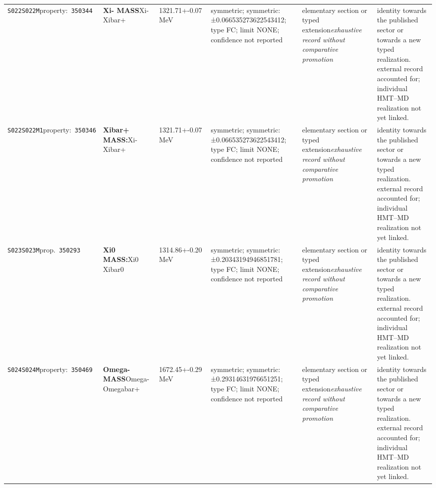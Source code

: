 \begin{landscape}
\begin{longtable}{L{1.85cm}L{4.45cm}L{2.35cm}L{4.05cm}L{3.35cm}L{7.15cm}}
\texttt{S022}\newline \texttt{S022M}\newline property:\ \texttt{350344} & \textbf{Xi- MASS}\newline Xi- \textbar{}\allowbreak{} Xibar+ & 1321.71+-0.07\,MeV & symmetric; symmetric: ±0.066535273622543412; type FC; limit NONE; confidence not reported & elementary section or typed extension\newline \emph{exhaustive record without comparative promotion} & identity towards the published sector or towards a new typed realization. external record accounted for; individual HMT--MD realization not yet linked. \\
\texttt{S022}\newline \texttt{S022M1}\newline property:\ \texttt{350346} & \textbf{Xibar+ MASS:}\newline Xi- \textbar{}\allowbreak{} Xibar+ & 1321.71+-0.07\,MeV & symmetric; symmetric: ±0.066535273622543412; type FC; limit NONE; confidence not reported & elementary section or typed extension\newline \emph{exhaustive record without comparative promotion} & identity towards the published sector or towards a new typed realization. external record accounted for; individual HMT--MD realization not yet linked. \\
\texttt{S023}\newline \texttt{S023M}\newline prop.\ \texttt{350293} & \textbf{Xi0 MASS:}\newline Xi0 \textbar{}\allowbreak{} Xibar0 & 1314.86+-0.20\,MeV & symmetric; symmetric: ±0.20343194946851781; type FC; limit NONE; confidence not reported & elementary section or typed extension\newline \emph{exhaustive record without comparative promotion} & identity towards the published sector or towards a new typed realization. external record accounted for; individual HMT--MD realization not yet linked. \\
\texttt{S024}\newline \texttt{S024M}\newline property:\ \texttt{350469} & \textbf{Omega- MASS}\newline Omega- \textbar{}\allowbreak{} Omegabar+ & 1672.45+-0.29\,MeV & symmetric; symmetric: ±0.29314631976651251; type FC; limit NONE; confidence not reported & elementary section or typed extension\newline \emph{exhaustive record without comparative promotion} & identity towards the published sector or towards a new typed realization. external record accounted for; individual HMT--MD realization not yet linked. \\

\end{longtable}
\end{landscape}
